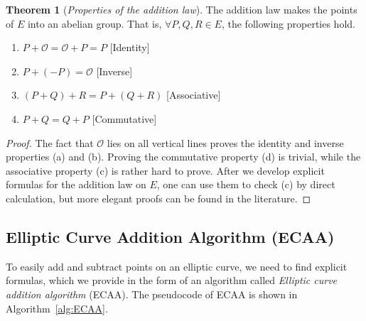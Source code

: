 \documentclass[9pt]{article}
\theoremstyle{definition}
\newtheorem{theorem}{Theorem}[section]
\begin{document}
\begin{theorem}[\textit{Properties of the addition law}]
The addition law makes the points of $E$ into an abelian group. That is, $\forall P,Q,R \in E$, the following properties hold.
\begin{enumerate}[label=(\alph*)]
	\item $P + \mathcal{O} = \mathcal{O} + P = P$ \hfill [Identity]
	\item $P + (-P) = \mathcal{O}$ \hfill [Inverse]
	\item $(P + Q) + R = P + (Q + R)$ \hfill [Associative]
	\item $P + Q = Q + P$ \hfill [Commutative]
\end{enumerate}
\label{th:propaddlaw}
\end{theorem}
\begin{proof}
	The fact that $\mathcal{O}$ lies on all vertical lines proves the identity and inverse properties (a) and (b). Proving the commutative property (d) is trivial, while the associative property (c) is rather hard to prove. After we develop explicit formulas for the addition law on $E$, one can use them to check (c) by direct calculation, but more elegant proofs can be found in the literature.
\end{proof}

\subsection{Elliptic Curve Addition Algorithm (ECAA)}
To easily add and subtract points on an elliptic curve, we need to find explicit formulas, which we provide in the form of an algorithm called \textit{Elliptic curve addition algorithm} (ECAA). The pseudocode of ECAA is shown in Algorithm~\ref{alg:ECAA}.
\end{document}

